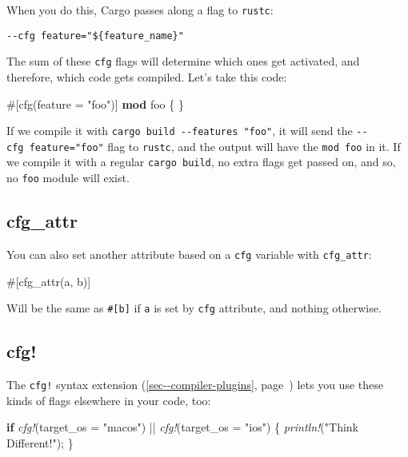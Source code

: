\documentclass[a4paper,]{book}
\renewcommand*{\hyperlink}[2]{%
 #2 (\autoref{#1}, page~\pageref{#1})}
\newenvironment{Shaded}{\begin{snugshade}}{\end{snugshade}}
\newcommand{\KeywordTok}[1]{\textcolor[rgb]{0.13,0.29,0.53}{\textbf{{#1}}}}
\newcommand{\StringTok}[1]{\textcolor[rgb]{0.31,0.60,0.02}{{#1}}}
\newcommand{\PreprocessorTok}[1]{\textcolor[rgb]{0.56,0.35,0.01}{\textit{{#1}}}}
\newcommand{\AttributeTok}[1]{\textcolor[rgb]{0.77,0.63,0.00}{{#1}}}
\newcommand{\NormalTok}[1]{{#1}}
\begin{document}
When you do this, Cargo passes along a flag to \texttt{rustc}:

\begin{verbatim}
--cfg feature="${feature_name}"
\end{verbatim}

The sum of these \texttt{cfg} flags will determine which ones get
activated, and therefore, which code gets compiled. Let's take this
code:

\begin{Shaded}
\begin{Highlighting}[]
\AttributeTok{#[}\NormalTok{cfg}\AttributeTok{(}\NormalTok{feature }\AttributeTok{=} \StringTok{"foo"}\AttributeTok{)]}
\KeywordTok{mod} \NormalTok{foo \{}
\NormalTok{\}}
\end{Highlighting}
\end{Shaded}

If we compile it with \texttt{cargo\ build\ -\/-features\ "foo"}, it
will send the \texttt{-\/-cfg\ feature="foo"} flag to \texttt{rustc},
and the output will have the \texttt{mod\ foo} in it. If we compile it
with a regular \texttt{cargo\ build}, no extra flags get passed on, and
so, no \texttt{foo} module will exist.

\subsection{cfg\_attr}\label{cfg_attr}

You can also set another attribute based on a \texttt{cfg} variable with
\texttt{cfg\_attr}:

\begin{Shaded}
\begin{Highlighting}[]
\AttributeTok{#[}\NormalTok{cfg_attr}\AttributeTok{(}\NormalTok{a}\AttributeTok{,} \NormalTok{b}\AttributeTok{)]}
\end{Highlighting}
\end{Shaded}

Will be the same as \texttt{\#{[}b{]}} if \texttt{a} is set by
\texttt{cfg} attribute, and nothing otherwise.

\subsection{cfg!}\label{cfg}

The \texttt{cfg!} \protect\hyperlink{sec--compiler-plugins}{syntax
extension} lets you use these kinds of flags elsewhere in your code,
too:

\begin{Shaded}
\begin{Highlighting}[]
\KeywordTok{if} \PreprocessorTok{cfg!}\NormalTok{(target_os = }\StringTok{"macos"}\NormalTok{) || }\PreprocessorTok{cfg!}\NormalTok{(target_os = }\StringTok{"ios"}\NormalTok{) \{}
    \PreprocessorTok{println!}\NormalTok{(}\StringTok{"Think Different!"}\NormalTok{);}
\NormalTok{\}}
\end{Highlighting}
\end{Shaded}
\end{document}
